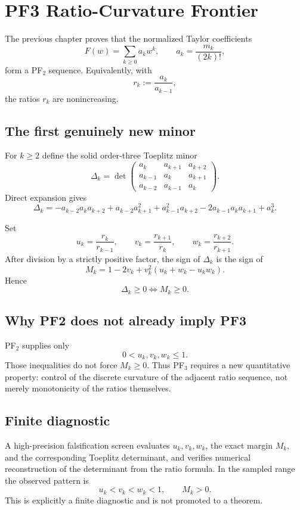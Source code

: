 \chapter{PF3 Ratio-Curvature Frontier}
\label{chap:pf3-ratio-curvature}


The previous chapter proves that the normalized Taylor coefficients
\[
F(w)=\sum_{k\ge0}a_k w^k,
\qquad
 a_k=\frac{m_k}{(2k)!},
\]
form a PF$_2$ sequence.  Equivalently, with
\[
r_k:=\frac{a_k}{a_{k-1}},
\]
the ratios $r_k$ are nonincreasing.

\section{The first genuinely new minor}

For $k\ge2$ define the solid order-three Toeplitz minor
\[
\Delta_k=
\det\begin{pmatrix}
 a_k&a_{k+1}&a_{k+2}\\
 a_{k-1}&a_k&a_{k+1}\\
 a_{k-2}&a_{k-1}&a_k
\end{pmatrix}.
\]
Direct expansion gives
\[
\Delta_k=
-a_{k-2}a_ka_{k+2}
+a_{k-2}a_{k+1}^2
+a_{k-1}^2a_{k+2}
-2a_{k-1}a_ka_{k+1}
+a_k^3.
\]

Set
\[
u_k=\frac{r_k}{r_{k-1}},\qquad
v_k=\frac{r_{k+1}}{r_k},\qquad
w_k=\frac{r_{k+2}}{r_{k+1}}.
\]
After division by a strictly positive factor, the sign of $\Delta_k$ is the sign of
\[
\boxed{
M_k=1-2v_k+v_k^2(u_k+w_k-u_kw_k).
}
\]
Hence
\[
\boxed{\Delta_k\ge0\iff M_k\ge0.}
\]

\section{Why PF2 does not already imply PF3}

PF$_2$ supplies only
\[
0<u_k,v_k,w_k\le1.
\]
Those inequalities do not force $M_k\ge0$.  Thus PF$_3$ requires a new quantitative property: control of the discrete curvature of the adjacent ratio sequence, not merely monotonicity of the ratios themselves.

\section{Finite diagnostic}

A high-precision falsification screen evaluates $u_k,v_k,w_k$, the exact margin $M_k$, and the corresponding Toeplitz determinant, and verifies numerical reconstruction of the determinant from the ratio formula.  In the sampled range the observed pattern is
\[
u_k<v_k<w_k<1,
\qquad
M_k>0.
\]
This is explicitly a finite diagnostic and is not promoted to a theorem.

